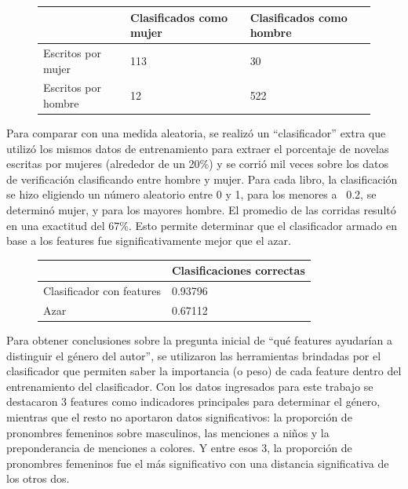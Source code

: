 \documentclass[
journal=jacsat, %
manuscript=article]{achemso}
\begin{document}
\begin{figure}[H]
  \centering
  \begin{table}[H]
      \begin{tabular}{|l|l|l|}
      \hline
      ~                   & Clasificados como mujer & Clasificados como hombre \\ \hline
      Escritos por mujer  & 113                     & 30                       \\ \hline
      Escritos por hombre & 12                      & 522                      \\ \hline
      \end{tabular}
  \end{table}
  \caption{}
\end{figure}


Para comparar con una medida aleatoria, se realizó un “clasificador” extra que utilizó los mismos datos de entrenamiento para extraer el porcentaje de novelas escritas por mujeres (alrededor de un 20\%) y se corrió mil veces sobre los datos de verificación clasificando entre hombre y mujer. Para cada libro, la clasificación se hizo eligiendo un número aleatorio entre 0 y 1, para los menores a ~0.2, se determinó mujer, y para los mayores hombre. El promedio de las corridas resultó en una exactitud del 67\%. Esto permite determinar que el clasificador armado en base a los features fue significativamente mejor que el azar.

\begin{figure}[H]
  \centering
  \begin{table}[H]
    \begin{tabular}{|l|l|}
      \hline
      ~                         & Clasificaciones correctas \\ \hline
      Clasificador con features & 0.93796                   \\ \hline
      Azar                      & 0.67112                   \\ \hline
      \end{tabular}
  \end{table}
  \caption{}
\end{figure}


Para obtener conclusiones sobre la pregunta inicial de “qué features ayudarían a distinguir el género del autor”, se utilizaron las herramientas brindadas por el clasificador que permiten saber la importancia (o peso) de cada feature dentro del entrenamiento del clasificador. Con los datos ingresados para este trabajo se destacaron 3 features como indicadores principales para determinar el género, mientras que el resto no aportaron datos significativos: la proporción de pronombres femeninos sobre masculinos, las menciones a niños y la preponderancia de menciones a colores. Y entre esos 3, la proporción de pronombres femeninos fue el más significativo con una distancia significativa de los otros dos.
\end{document}

